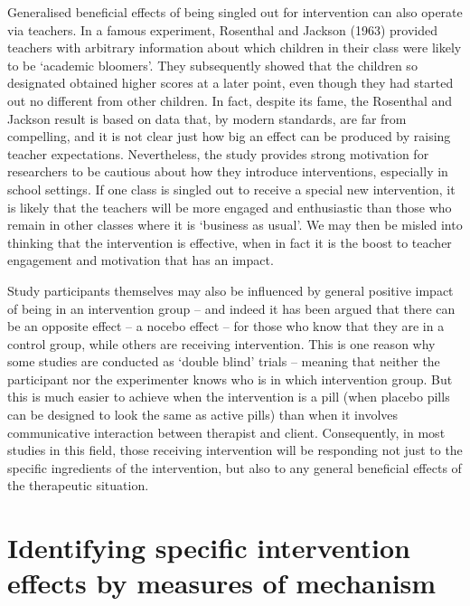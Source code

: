 \documentclass[]{book}
\begin{document}
Generalised beneficial effects of being singled out for intervention can also operate via teachers. In a famous experiment, Rosenthal and Jackson (1963) provided teachers with arbitrary information about which children in their class were likely to be `academic bloomers'. They subsequently showed that the children so designated obtained higher scores at a later point, even though they had started out no different from other children. In fact, despite its fame, the Rosenthal and Jackson result is based on data that, by modern standards, are far from compelling, and it is not clear just how big an effect can be produced by raising teacher expectations. Nevertheless, the study provides strong motivation for researchers to be cautious about how they introduce interventions, especially in school settings. If one class is singled out to receive a special new intervention, it is likely that the teachers will be more engaged and enthusiastic than those who remain in other classes where it is `business as usual'. We may then be misled into thinking that the intervention is effective, when in fact it is the boost to teacher engagement and motivation that has an impact.

Study participants themselves may also be influenced by general positive impact of being in an intervention group -- and indeed it has been argued that there can be an opposite effect -- a nocebo effect -- for those who know that they are in a control group, while others are receiving intervention. This is one reason why some studies are conducted as `double blind' trials -- meaning that neither the participant nor the experimenter knows who is in which intervention group. But this is much easier to achieve when the intervention is a pill (when placebo pills can be designed to look the same as active pills) than when it involves communicative interaction between therapist and client. Consequently, in most studies in this field, those receiving intervention will be responding not just to the specific ingredients of the intervention, but also to any general beneficial effects of the therapeutic situation.

\hypertarget{identifying-specific-intervention-effects-by-measures-of-mechanism}{%
\section{Identifying specific intervention effects by measures of mechanism}\label{identifying-specific-intervention-effects-by-measures-of-mechanism}}
\end{document}
